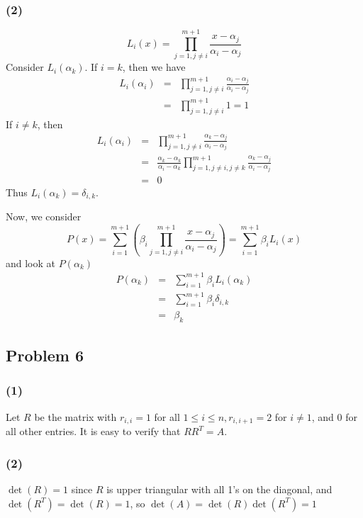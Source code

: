 \documentclass{article}
\begin{document}
\subsubsection{(2)}
\[L_i(x) = \prod_{j=1, j \neq i}^{m+1}\frac{x-\alpha_j}{\alpha_i-\alpha_j}\]
Consider $L_i(\alpha_k)$. If $i = k$, then we have 
\begin{eqnarray*}
L_i(\alpha_i) 
&=& \prod_{j=1, j \neq i}^{m+1}\frac{\alpha_i-\alpha_j}{\alpha_i-\alpha_j}\\
&=& \prod_{j=1, j \neq i}^{m+1}1 = 1
\end{eqnarray*}
If $i \neq k$, then 
\begin{eqnarray*}
L_i(\alpha_i) 
&=& \prod_{j=1, j \neq i}^{m+1}\frac{\alpha_k-\alpha_j}{\alpha_i-\alpha_j}\\
&=& \frac{\alpha_k-\alpha_k}{\alpha_i-\alpha_k}\prod_{j=1, j \neq i, j \neq
k}^{m+1}\frac{\alpha_k-\alpha_j}{\alpha_i-\alpha_j} \\
&=& 0
\end{eqnarray*}
Thus $L_i(\alpha_k) = \delta_{i,k}$.
\medskip

Now, we consider
\[P(x) = \sum_{i=1}^{m+1}
    \left(\beta_i \prod_{j=1, j \neq
    i}^{m+1}\frac{x-\alpha_j}{\alpha_i-\alpha_j}\right)
     = \sum_{i=1}^{m+1} \beta_i L_i(x)
    \]
and look at $P(\alpha_k)$
\begin{eqnarray*}
P(\alpha_k) &=& \sum_{i=1}^{m+1} \beta_i L_i(\alpha_k) \\
&=& \sum_{i=1}^{m+1} \beta_i \delta_{i,k}\\
&=& \beta_k
\end{eqnarray*}

\subsection{Problem 6}
\subsubsection{(1)} Let $R$ be the matrix with $r_{i,i}=1$ for all $1\le i\le n, r_{i,i+1}=2$ for $i\neq 1$, and 0 for all other entries. It is easy to verify that $RR^T=A$. 
\subsubsection{(2)} $\det(R)=1$ since $R$ is upper triangular with all 1's on the diagonal, and $\det(R^T)=\det(R)=1$, so $\det(A)=\det(R)\det(R^T)=1$
\end{document}
